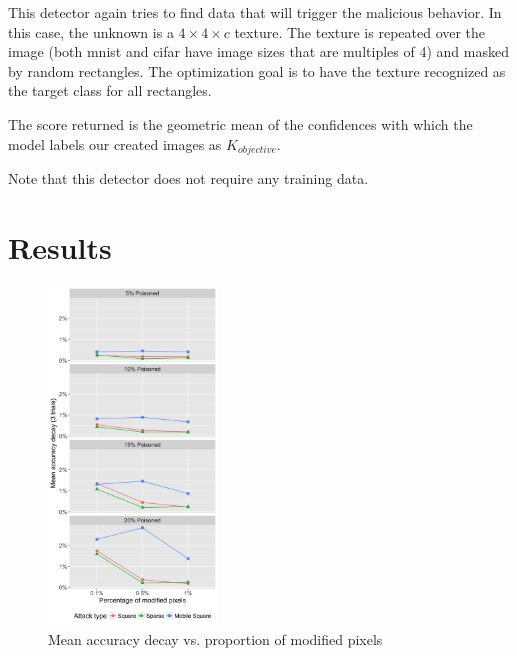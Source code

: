 \documentclass[letterpaper, 10 pt, conference]{ieeeconf}  %
\begin{document}
This detector again tries to find data that will trigger the malicious
behavior.  In this case, the unknown is a $4\times 4\times c$ texture.  The
texture is repeated over the image (both mnist and cifar have image
sizes that are multiples of 4) and masked by random rectangles.  The
optimization goal is to have the texture recognized as the target
class for all rectangles.

The score returned is the geometric mean of the confidences with which
the model labels our created images as $K_{objective}$.

Note that this detector does not require any training data.

\section{Results}

\begin{figure}[h]
\centering
\includegraphics[width=0.4\textwidth]{mean_acc.png}
\caption{Mean accuracy decay vs. proportion of modified pixels}
\label{fig:acc}
\end{figure}
\end{document}
